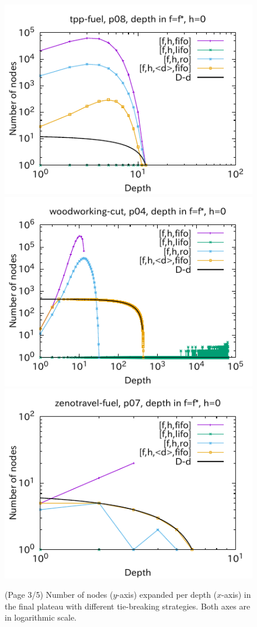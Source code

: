 \begin{figure}[htbp]
\includegraphics{img/output-lmcut/tpp-fuel/p08-0.pdf}
\includegraphics{img/output-lmcut/woodworking-cut/p04-0.pdf}
\includegraphics{img/output-lmcut/zenotravel-fuel/p07-0.pdf}
 \caption{(Page 3/5) Number of nodes ($y$-axis) expanded per depth ($x$-axis) in
 the final plateau with different tie-breaking strategies. Both axes are in logarithmic scale.
 }
 \label{fig:depth-histogram3}
\end{figure}

